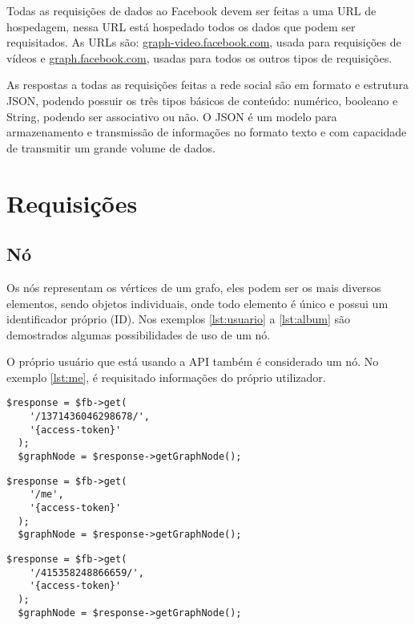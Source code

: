 Todas as requisições de dados ao Facebook devem ser feitas a uma URL de hospedagem, nessa URL está hospedado todos os dados que podem ser requisitados. As URLs são: \url{graph-video.facebook.com}, usada para requisições de vídeos e \url{graph.facebook.com}, usadas para todos os outros tipos de requisições.

As respostas a todas as requisições feitas a rede social são em formato e estrutura JSON, podendo possuir os três tipos básicos de conteúdo: numérico, booleano e String, podendo ser associativo ou não. O JSON é um modelo para armazenamento e transmissão de informações no formato texto e com capacidade de transmitir um grande volume de dados.


\section{Requisições}
\subsection{Nó}
Os nós representam os vértices de um grafo, eles podem ser os mais diversos elementos, sendo objetos individuais, onde todo elemento é único e possui um identificador próprio (ID). Nos exemplos \ref{lst:usuario} a \ref{lst:album} são demostrados algumas possibilidades de uso de um nó.

O próprio usuário que está usando a API também é considerado um nó. No exemplo \ref{lst:me}, é requisitado informações do próprio utilizador.

\begin{lstlisting}[caption={Requisitar informações de um usuário específico},label={lst:usuario}]
  $response = $fb->get(
    '/1371436046298678/',
    '{access-token}'
  );
  $graphNode = $response->getGraphNode();
\end{lstlisting}

\begin{lstlisting}[caption={Requisitar informações do próprio usuário},label={lst:me}]
  $response = $fb->get(
    '/me',
    '{access-token}'
  );
  $graphNode = $response->getGraphNode();
\end{lstlisting}

\begin{lstlisting}[caption={Requisitar informações de uma página},label={lst:pagina}]
  $response = $fb->get(
    '/415358248866659/',
    '{access-token}'
  );
  $graphNode = $response->getGraphNode();
\end{lstlisting}

